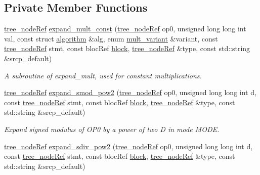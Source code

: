 \subsection*{Private Member Functions}
\begin{DoxyCompactItemize}
\item 
\hyperlink{tree__node_8hpp_a6ee377554d1c4871ad66a337eaa67fd5}{tree\+\_\+node\+Ref} \hyperlink{classIR__lowering_ae6f7d0298f7b68ce521fc42e769a090f}{expand\+\_\+mult\+\_\+const} (\hyperlink{tree__node_8hpp_a6ee377554d1c4871ad66a337eaa67fd5}{tree\+\_\+node\+Ref} op0, unsigned long long int val, const struct \hyperlink{structalgorithm}{algorithm} \&alg, enum \hyperlink{IR__lowering_8hpp_a77bda416aea7fadb7ca07415dc736441}{mult\+\_\+variant} \&variant, const \hyperlink{tree__node_8hpp_a6ee377554d1c4871ad66a337eaa67fd5}{tree\+\_\+node\+Ref} stmt, const bloc\+Ref \hyperlink{structblock}{block}, \hyperlink{tree__node_8hpp_a6ee377554d1c4871ad66a337eaa67fd5}{tree\+\_\+node\+Ref} \&type, const std\+::string \&srcp\+\_\+default)
\begin{DoxyCompactList}\small\item\em A subroutine of expand\+\_\+mult, used for constant multiplications. \end{DoxyCompactList}\item 
\hyperlink{tree__node_8hpp_a6ee377554d1c4871ad66a337eaa67fd5}{tree\+\_\+node\+Ref} \hyperlink{classIR__lowering_ab4fe755c5983da121948673fbcc4faea}{expand\+\_\+smod\+\_\+pow2} (\hyperlink{tree__node_8hpp_a6ee377554d1c4871ad66a337eaa67fd5}{tree\+\_\+node\+Ref} op0, unsigned long long int d, const \hyperlink{tree__node_8hpp_a6ee377554d1c4871ad66a337eaa67fd5}{tree\+\_\+node\+Ref} stmt, const bloc\+Ref \hyperlink{structblock}{block}, \hyperlink{tree__node_8hpp_a6ee377554d1c4871ad66a337eaa67fd5}{tree\+\_\+node\+Ref} \&type, const std\+::string \&srcp\+\_\+default)
\begin{DoxyCompactList}\small\item\em Expand signed modulus of O\+P0 by a power of two D in mode M\+O\+DE. \end{DoxyCompactList}\item 
\hyperlink{tree__node_8hpp_a6ee377554d1c4871ad66a337eaa67fd5}{tree\+\_\+node\+Ref} \hyperlink{classIR__lowering_a8f9128221ba101fb76a525f5db6e324a}{expand\+\_\+sdiv\+\_\+pow2} (\hyperlink{tree__node_8hpp_a6ee377554d1c4871ad66a337eaa67fd5}{tree\+\_\+node\+Ref} op0, unsigned long long int d, const \hyperlink{tree__node_8hpp_a6ee377554d1c4871ad66a337eaa67fd5}{tree\+\_\+node\+Ref} stmt, const bloc\+Ref \hyperlink{structblock}{block}, \hyperlink{tree__node_8hpp_a6ee377554d1c4871ad66a337eaa67fd5}{tree\+\_\+node\+Ref} \&type, const std\+::string \&srcp\+\_\+default)

\end{DoxyCompactItemize}
